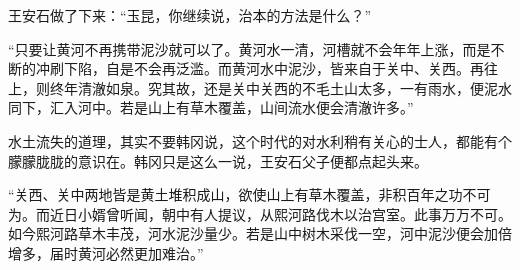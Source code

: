 王安石做了下来：“玉昆，你继续说，治本的方法是什么？”

“只要让黄河不再携带泥沙就可以了。黄河水一清，河槽就不会年年上涨，而是不断的冲刷下陷，自是不会再泛滥。而黄河水中泥沙，皆来自于关中、关西。再往上，则终年清澈如泉。究其故，还是关中关西的不毛土山太多，一有雨水，便泥水同下，汇入河中。若是山上有草木覆盖，山间流水便会清澈许多。”

水土流失的道理，其实不要韩冈说，这个时代的对水利稍有关心的士人，都能有个朦朦胧胧的意识在。韩冈只是这么一说，王安石父子便都点起头来。

“关西、关中两地皆是黄土堆积成山，欲使山上有草木覆盖，非积百年之功不可为。而近日小婿曾听闻，朝中有人提议，从熙河路伐木以治宫室。此事万万不可。如今熙河路草木丰茂，河水泥沙量少。若是山中树木采伐一空，河中泥沙便会加倍增多，届时黄河必然更加难治。”

